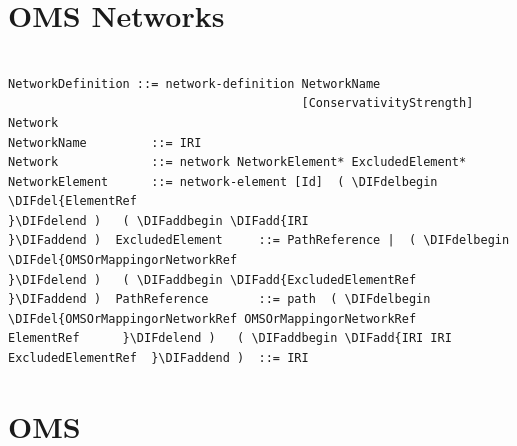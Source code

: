 \documentclass[10pt,fleqn,final]{scrreprt}
\makeatletter
\newcommand*{\eg}{e.g.\@\xspace}
\newcommand*\CommentAuthor{}
\renewcommand*\CommentAuthor{#1}}
\newcommand*\CommentDate{}
\renewcommand*\CommentDate{#1}}
\newcommand*\CommentId{}
\renewcommand*\CommentId{#1}}
\newcommand*\CommentType{}
\renewcommand*\CommentType{#1}}
\newcommand*{\SetCommentColorByType}[1]{%
\edef\localType{{#1}}%
\expandafter\ifstrequal\localType{q-aut}{\colorlet{CommentColor}{red}}{%
\expandafter\ifstrequal\localType{q-all}{\colorlet{CommentColor}{orange}}{%
\expandafter\ifstrequal\localType{todo}{\colorlet{CommentColor}{orange}}{%
\expandafter\ifstrequal\localType{fyi}{\colorlet{CommentColor}{lightgray}}{%
\colorlet{CommentColor}{yellow}}}}}}
\newcommand*{\SetCommentPrefixByType}[1]{%
\edef\localType{{#1}}%
\expandafter\@ifmtarg\localType{%
\edef\CommentPrefix{}%
}{%
\caseupper[q]{#1}%
\edef\CommentPrefix{\thestring: }%
}}
\newcommand*{\initComment}[1]{%
\setkeys{Comment}{#1}%
\SetCommentColorByType{\CommentType}%
\relax%
\SetCommentPrefixByType{\CommentType}%
\relax%
}
\newcommand*{\todonote}[2][]{%
\initComment{#1}%
\pdfcomment[author=\CommentAuthor,color=CommentColor,date=\CommentDate,id=\CommentId]{%
\CommentPrefix
#2}}
\renewcommand*{\todonote}[2][]{%
\initComment{#1}%
\ednote{\CommentPrefix #2}}
\renewcommand*{\textLF}{\\}
\newcommand{\sclause}[1]{\section{#1}}
\newenvironment{definitions}[0]{\medskip }{}
\providecommand{\DIFadd}[1]{{\protect\color{blue}\uwave{#1}}} %
\providecommand{\DIFdel}[1]{{\protect\color{red}\sout{#1}}}                      %
\providecommand{\DIFaddbegin}{} %
\providecommand{\DIFaddend}{} %
\providecommand{\DIFdelbegin}{} %
\providecommand{\DIFdelend}{} %
\makeatother
\begin{document}
\begin{definitions}


\sclause{OMS Networks}\label{a:networks}
\begin{lstlisting}[language=ebnf,escapeinside={()}]  % abstract syntax

NetworkDefinition ::= network-definition NetworkName
                                         [ConservativityStrength] Network
NetworkName         ::= IRI
Network             ::= network NetworkElement* ExcludedElement*
NetworkElement      ::= network-element [Id]  ( \DIFdelbegin \DIFdel{ElementRef
}\DIFdelend )   ( \DIFaddbegin \DIFadd{IRI
}\DIFaddend )  ExcludedElement     ::= PathReference |  ( \DIFdelbegin \DIFdel{OMSOrMappingorNetworkRef
}\DIFdelend )   ( \DIFaddbegin \DIFadd{ExcludedElementRef
}\DIFaddend )  PathReference       ::= path  ( \DIFdelbegin \DIFdel{OMSOrMappingorNetworkRef OMSOrMappingorNetworkRef
ElementRef      }\DIFdelend )   ( \DIFaddbegin \DIFadd{IRI IRI
ExcludedElementRef  }\DIFaddend )  ::= IRI
\end{lstlisting}



\sclause{OMS}

\begin{lstlisting}[language=ebnf,escapeinside={()}]  % abstract syntax


\end{lstlisting}
\end{definitions}
\end{document}

